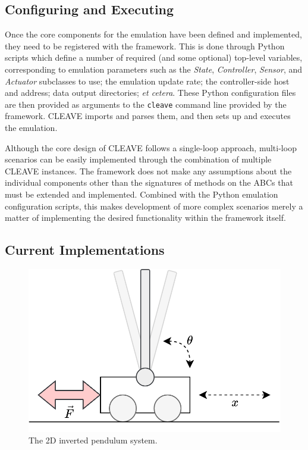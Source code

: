 \subsection{Configuring and Executing }

Once the core components for the emulation have been defined and implemented, they need to be registered with the framework.
This is done through Python scripts which define a number of required (and some optional) top-level variables, corresponding to emulation parameters such as the \emph{State}, \emph{Controller}, \emph{Sensor}, and \emph{Actuator} subclasses to use; the emulation update rate; the controller-side host and address; data output directories; \emph{et cetera}.
These Python configuration files are then provided as arguments to the \texttt{cleave} command line provided by the framework.
\gls{CLEAVE} imports and parses them, and then sets up and executes the emulation.

Although the core design of \gls{CLEAVE} follows a single-loop approach, multi-loop scenarios can be easily implemented through the combination of multiple \gls{CLEAVE} instances.
The framework does not make any assumptions about the individual components other than the signatures of methods on the \glspl{ABC} that must be extended and implemented.
Combined with the Python emulation configuration scripts, this makes development of more complex scenarios merely a matter of implementing the desired functionality within the framework itself.

\subsection{Current Implementations}

\begin{figure}
    \centering
    \includegraphics[width=.6\columnwidth]{publications/2022CLEAVE/images/inverted_pendulum}
    \caption{
        The 2D inverted pendulum system.
    }\label{paper:olguinmunoz2022cleave:fig:invpend}
\end{figure}

